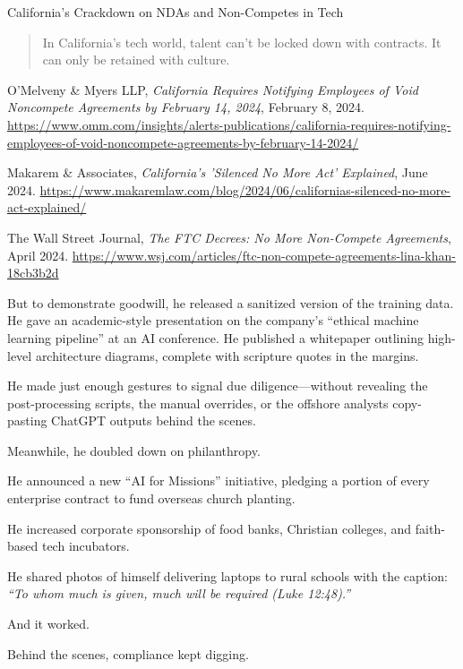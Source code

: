 \begin{HistoricalSidebar}{California’s Crackdown on NDAs and Non-Competes in Tech}
\begin{quote}
In California’s tech world, talent can’t be locked down with contracts.  
It can only be retained with culture.
\end{quote}

\begin{thebibliography}{9}
O'Melveny \& Myers LLP, \textit{California Requires Notifying Employees of Void Noncompete Agreements by February 14, 2024}, February 8, 2024. \url{https://www.omm.com/insights/alerts-publications/california-requires-notifying-employees-of-void-noncompete-agreements-by-february-14-2024/}

Makarem \& Associates, \textit{California's 'Silenced No More Act' Explained}, June 2024. \url{https://www.makaremlaw.com/blog/2024/06/californias-silenced-no-more-act-explained/}

The Wall Street Journal, \textit{The FTC Decrees: No More Non-Compete Agreements}, April 2024. \url{https://www.wsj.com/articles/ftc-non-compete-agreements-lina-khan-18cb3b2d}
\end{thebibliography}
\end{HistoricalSidebar}

\medskip


But to demonstrate goodwill, he released a sanitized version of the training data.  
He gave an academic-style presentation on the company’s “ethical machine learning pipeline” at an AI conference.  
He published a whitepaper outlining high-level architecture diagrams, complete with scripture quotes in the margins.

He made just enough gestures to signal due diligence—without revealing the post-processing scripts, the manual overrides, or the offshore analysts copy-pasting ChatGPT outputs behind the scenes.

Meanwhile, he doubled down on philanthropy.

He announced a new “AI for Missions” initiative, pledging a portion of every enterprise contract to fund overseas church planting.

He increased corporate sponsorship of food banks, Christian colleges, and faith-based tech incubators.

He shared photos of himself delivering laptops to rural schools with the caption:  
\textit{“To whom much is given, much will be required (Luke 12:48).”}

And it worked.

Behind the scenes, compliance kept digging.

